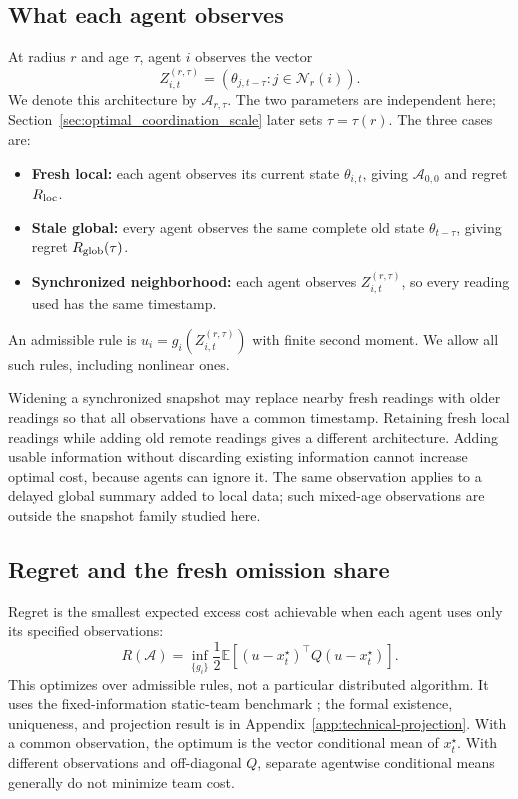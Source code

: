 \documentclass[11pt]{article}
\begin{document}
\subsection{What each agent observes}
\label{subsec:architectures}

At radius $r$ and age $\tau$, agent $i$ observes the vector
\begin{equation}
Z_{i,t}^{(r,\tau)}=(\theta_{j,t-\tau}:j\in\mathcal N_r(i)).
\label{eq:radius_arch}
\end{equation}
We denote this architecture by $\mathcal A_{r,\tau}$. The two parameters
are independent here; Section~\ref{sec:optimal_coordination_scale} later
sets $\tau=\tau(r)$. The three cases are:
\begin{itemize}
\item \textbf{Fresh local:} each agent observes its current state $\theta_{i,t}$,
giving $\mathcal A_{0,0}$ and regret $R_{\rm loc}$.
\item \textbf{Stale global:} every agent observes the same complete old state
$\theta_{t-\tau}$, giving regret $R_{\rm glob}(\tau)$.
\item \textbf{Synchronized neighborhood:} each agent observes
$Z_{i,t}^{(r,\tau)}$, so every reading used has the same timestamp.
\end{itemize}
An admissible rule is $u_i=g_i(Z_{i,t}^{(r,\tau)})$ with finite second
moment. We allow all such rules, including nonlinear ones.

Widening a synchronized snapshot may replace nearby fresh readings with
older readings so that all observations have a common timestamp. Retaining
fresh local readings while adding old remote readings gives a different
architecture. Adding usable information without discarding existing
information cannot increase optimal cost, because agents can ignore it.
The same observation applies to a delayed global summary added to local data;
such mixed-age observations are outside the snapshot family studied here.

\subsection{Regret and the fresh omission share}
\label{subsec:architecture_regret}

Regret is the smallest expected excess cost achievable when each agent uses
only its specified observations:
\begin{equation}
R(\mathcal A)=\inf_{\{g_i\}}\frac12
\mathbb E[(u-x_t^\star)^\top Q(u-x_t^\star)].
\label{eq:architecture_regret}
\end{equation}
This optimizes over admissible rules, not a particular distributed algorithm.
It uses the fixed-information static-team benchmark
\cite{radner1962team,krainak1982staticII}; the formal existence, uniqueness,
and projection result is in Appendix~\ref{app:technical-projection}.
With a common observation, the optimum is the vector conditional mean of
$x_t^\star$. With different observations and off-diagonal $Q$, separate
agentwise conditional means generally do not minimize team cost.
\end{document}
